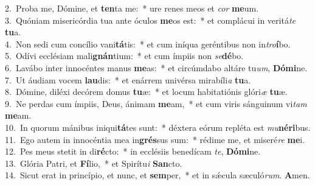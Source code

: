{2.~}Proba me, Dómine, et \textbf{ten}ta me:~* ure renes meos et \textit{cor} \textbf{me}um.\\
{3.~}Quóniam misericórdia tua ante óculos \textbf{me}os est:~* et complácui in veritá\textit{te} \textbf{tu}a.\\
{4.~}Non sedi cum concílio vani\textbf{tá}tis:~* et cum iníqua geréntibus non in\textit{tro}\textbf{í}bo.\\
{5.~}Odívi ecclésiam mali\textbf{gnán}tium:~* et cum ímpiis non \textit{se}\textbf{dé}bo.\\
{6.~}Lavábo inter innocéntes manus \textbf{me}as:~* et circúmdabo altáre tu\textit{um}, \textbf{Dó}\textbf{mi}ne.\\
{7.~}Ut áudiam vocem \textbf{lau}dis:~* et enárrem univérsa mirabíli\textit{a} \textbf{tu}a.\\
{8.~}Dómine, diléxi decórem domus \textbf{tu}æ:~* et locum habitatiónis glóri\textit{æ} \textbf{tu}æ.\\
{9.~}Ne perdas cum ímpiis, Deus, ánimam \textbf{me}am,~* et cum viris sánguinum vi\textit{tam} \textbf{me}am.\\
{10.~}In quorum mánibus iniqui\textbf{tá}tes sunt:~* déxtera eórum repléta est \textit{mu}\textbf{né}\textbf{ri}bus.\\
{11.~}Ego autem in innocéntia mea in\textbf{grés}sus sum:~* rédime me, et miseré\textit{re} \textbf{me}i.\\
{12.~}Pes meus stetit in di\textbf{ré}cto:~* in ecclésiis benedícam \textit{te}, \textbf{Dó}\textbf{mi}ne.\\
{13.~}Glória Patri, et \textbf{Fí}lio,~* et Spirítu\textit{i} \textbf{San}cto.\\
{14.~}Sicut erat in princípio, et nunc, et \textbf{sem}per,~* et in sǽcula sæculó\textit{rum}. \textbf{A}men.\\
